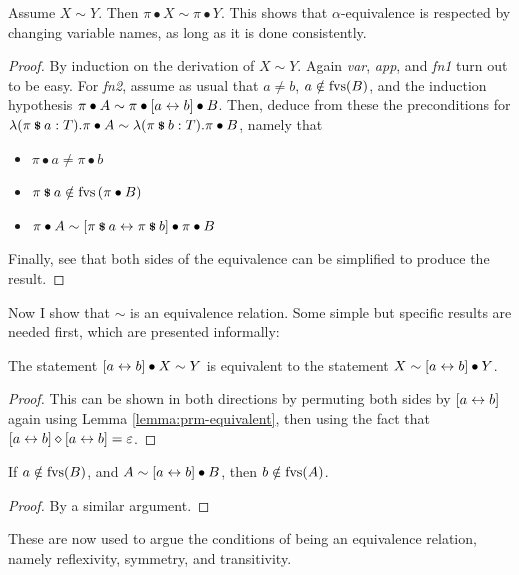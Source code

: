 \begin{lemma}
\label{lemma:prm-equivalent}
Assume \(X \sim Y\).
Then \(\pi \bullet X \sim \pi \bullet Y\).
This shows that \(\alpha\)-equivalence is respected by changing variable names, as long as it is done consistently.
\end{lemma}
\begin{proof}
By induction on the derivation of \(X \sim Y\).
Again \emph{var}, \emph{app}, and \emph{fn1} turn out to be easy.
For \emph{fn2}, assume as usual that \(a \neq b\), \(a \notin \mathrm{fvs}(B)\), and the induction hypothesis \(\pi \bullet A \sim \pi \bullet [a \leftrightarrow b] \bullet B\).
Then, deduce from these the preconditions for \(\lambda (\pi \mathbin{\textrm{\footnotesize{\textbf{\$}}}} a:T). \pi \bullet A \sim \lambda (\pi \mathbin{\textrm{\footnotesize{\textbf{\$}}}} b:T). \pi \bullet B\), namely that
\begin{itemize}
\item
\(\pi \bullet a \neq \pi \bullet b\)
\item
\(\pi \mathbin{\textrm{\footnotesize{\textbf{\$}}}} a \notin \mathrm{fvs}\left(\pi \bullet B\right)\)
\item
\(\pi \bullet A \sim [\pi \mathbin{\textrm{\footnotesize{\textbf{\$}}}} a \leftrightarrow \pi \mathbin{\textrm{\footnotesize{\textbf{\$}}}} b] \bullet \pi \bullet B\)
\end{itemize}
Finally, see that both sides of the equivalence can be simplified to produce the result.
\end{proof}

Now I show that \(\sim\) is an equivalence relation.
Some simple but specific results are needed first, which are presented informally:

\begin{lemma}
\label{lemma:transfer-swapping}
The statement \([a \leftrightarrow b] \bullet X \sim Y\) is equivalent to the statement \(X \sim [a \leftrightarrow b] \bullet Y\).
\end{lemma}
\begin{proof}
This can be shown in both directions by permuting both sides by \([a \leftrightarrow b]\) again using Lemma \ref{lemma:prm-equivalent}, then using the fact that \([a \leftrightarrow b] \diamond [a \leftrightarrow b] = \varepsilon\).
\end{proof}

\begin{lemma}
\label{lemma:transfer-freshness}
If \(a \notin \mathrm{fvs}(B)\), and \(A \sim [a \leftrightarrow b] \bullet B\), then \(b \notin \mathrm{fvs}(A)\).
\end{lemma}
\begin{proof}
By a similar argument.
\end{proof}

These are now used to argue the conditions of being an equivalence relation, namely reflexivity, symmetry, and transitivity.

